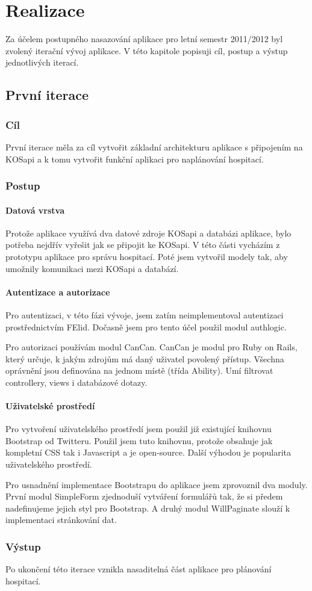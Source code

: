 \chapter{Realizace}
Za účelem postupného nasazování aplikace pro letní semestr 2011/2012 byl zvolený iterační vývoj aplikace. V této kapitole popisuji cíl, postup a výstup jednotlivých iterací.

\section{První iterace}
\subsection{Cíl}
První iterace měla za cíl vytvořit základní architekturu aplikace s připojením na KOSapi a k tomu vytvořit funkční aplikaci pro naplánování hospitací.

\subsection{Postup}
\subsubsection{Datová vrstva}
Protože aplikace využívá dva datové zdroje KOSapi a databázi aplikace, bylo potřeba nejdřív vyřešit jak se připojit ke KOSapi. V této části vycházím z prototypu aplikace pro správu hospitací. Poté jsem vytvořil modely tak, aby umožnily komunikaci mezi KOSapi a databází.

\subsubsection{Autentizace a autorizace}
Pro autentizaci, v této fázi vývoje, jsem zatím neimplementoval autentizaci prostřednictvím FElid. Dočasně jsem pro tento účel použil modul authlogic.

Pro autorizaci používám modul CanCan. CanCan je modul pro Ruby on Rails, který určuje, k jakým zdrojům má daný uživatel povolený přístup. Všechna oprávnění jsou definována na jednom místě (třída Ability). Umí filtrovat controllery, views i databázové dotazy.

\subsubsection{Uživatelské prostředí}
Pro vytvoření uživatelského prostředí jsem použil již existující knihovnu Bootstrap od Twitteru. Použil jsem tuto knihovnu, protože obsahuje jak kompletní CSS tak i Javascript a je open-source. Další výhodou je popularita uživatelského prostředí.

Pro usnadnění implementace Bootstrapu do aplikace jsem zprovoznil dva moduly. První modul SimpleForm zjednoduší vytváření formulářů tak, že si předem nadefinujeme jejich styl pro Bootstrap. A druhý modul WillPaginate slouží k implementaci stránkování dat.

\subsection{Výstup} 
Po ukončení této iterace vznikla nasaditelná část aplikace pro plánování hospitací.

